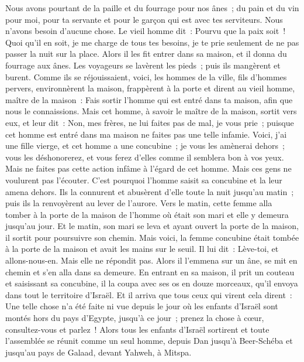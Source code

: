 \begin{multicols}{2}
Nous avons pourtant de la paille et du fourrage pour nos ânes~; du pain et du vin pour moi, pour ta servante et pour le garçon qui est avec tes serviteurs. Nous n'avons besoin d'aucune chose.
Le vieil homme dit~: Pourvu que la paix soit~! Quoi qu'il en soit, je me charge de tous tes besoins, je te prie seulement de ne pas passer la nuit sur la place.
Alors il les fit entrer dans sa maison, et il donna du fourrage aux ânes. Les voyageurs se lavèrent les pieds~; puis ils mangèrent et burent.
Comme ils se réjouissaient, voici, les hommes de la ville, fils d'hommes pervers, environnèrent la maison, frappèrent à la porte et dirent au vieil homme, maître de la maison~: Fais sortir l'homme qui est entré dans ta maison, afin que nous le connaissions.
Mais cet homme, à savoir le maître de la maison, sortit vers eux, et leur dit~: Non, mes frères, ne lui faites pas de mal, je vous prie~; puisque cet homme est entré dans ma maison ne faites pas une telle infamie.
Voici, j'ai une fille vierge, et cet homme a une concubine~; je vous les amènerai dehors~; vous les déshonorerez, et vous ferez d'elles comme il semblera bon à vos yeux. Mais ne faites pas cette action infâme à l'égard de cet homme.
Mais ces gens ne voulurent pas l'écouter. C'est pourquoi l'homme saisit sa concubine et la leur amena dehors. Ils la connurent et abusèrent d'elle toute la nuit jusqu'au matin~; puis ils la renvoyèrent au lever de l'aurore.
Vers le matin, cette femme alla tomber à la porte de la maison de l'homme où était son mari et elle y demeura jusqu'au jour.
Et le matin, son mari se leva et ayant ouvert la porte de la maison, il sortit pour poursuivre son chemin. Mais voici, la femme concubine était tombée à la porte de la maison et avait les mains sur le seuil.
Il lui dit~: Lève-toi, et allons-nous-en. Mais elle ne répondit pas. Alors il l'emmena sur un âne, se mit en chemin et s'en alla dans sa demeure.
En entrant en sa maison, il prit un couteau et saisissant sa concubine, il la coupa avec ses os en douze morceaux, qu'il envoya dans tout le territoire d'Israël.
Et il arriva que tous ceux qui virent cela dirent~: Une telle chose n'a été faite ni vue depuis le jour où les enfants d'Israël sont montés hors du pays d'Egypte, jusqu'à ce jour~; prenez la chose à cœur, consultez-vous et parlez~!
\VerseOne{}Alors tous les enfants d'Israël sortirent et toute l'assemblée se réunit comme un seul homme, depuis Dan jusqu'à Beer-Schéba et jusqu'au pays de Galaad, devant Yahweh, à Mitspa.

\end{multicols}
